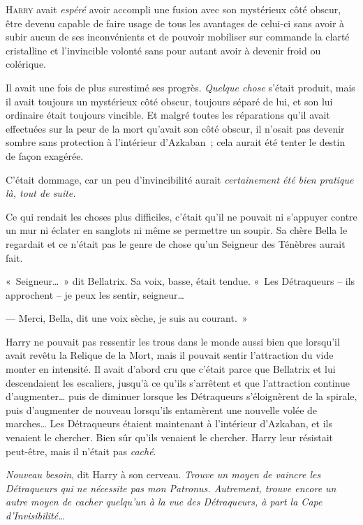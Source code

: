
\lettrine{H}{arry} avait \emph{espéré} avoir accompli une fusion avec son mystérieux côté obscur, être devenu capable de faire usage de tous les avantages de celui-ci sans avoir à subir aucun de ses inconvénients et de pouvoir mobiliser sur commande la clarté cristalline et l'invincible volonté sans pour autant avoir à devenir froid ou colérique.

Il avait une fois de plus surestimé ses progrès.
\emph{Quelque chose} s'était produit, mais il avait toujours un mystérieux côté obscur, toujours séparé de lui, et son lui ordinaire était toujours vincible.
Et malgré toutes les réparations qu'il avait effectuées sur la peur de la mort qu'avait son côté obscur, il n'osait pas devenir sombre sans protection à l'intérieur d'Azkaban~; cela aurait été tenter le destin de façon exagérée.

C'était dommage, car un peu d'invincibilité aurait \emph{certainement été bien pratique là, tout de suite.}

Ce qui rendait les choses plus difficiles, c'était qu'il ne pouvait ni s'appuyer contre un mur ni éclater en sanglots ni même se permettre un soupir.
Sa chère Bella le regardait et ce n'était pas le genre de chose qu'un Seigneur des Ténèbres aurait fait.

«~Seigneur…~»
 dit Bellatrix.
Sa voix, basse, était tendue.
«~Les Détraqueurs -- ils approchent -- je peux les sentir, seigneur…

--- Merci, Bella, dit une voix sèche, je suis au courant.~»

Harry ne pouvait pas ressentir les trous dans le monde aussi bien que lorsqu'il avait revêtu la Relique de la Mort, mais il pouvait sentir l'attraction du vide monter en intensité.
Il avait d'abord cru que c'était parce que Bellatrix et lui descendaient les escaliers, jusqu'à ce qu'ils s'arrêtent et que l'attraction continue d'augmenter… puis de diminuer lorsque les Détraqueurs s'éloignèrent de la spirale, puis d'augmenter de nouveau lorsqu'ils entamèrent une nouvelle volée de marches…
Les Détraqueurs étaient maintenant à l'intérieur d'Azkaban, et ils venaient le chercher.
Bien sûr qu'ils venaient le chercher.
Harry leur résistait peut-être, mais il n'était pas \emph{caché}.

\emph{Nouveau besoin}, dit Harry à son cerveau.
\emph{Trouve un moyen de vaincre les Détraqueurs qui ne nécessite pas mon Patronus.
Autrement, trouve encore un autre moyen de cacher quelqu'un à la vue des Détraqueurs, à part la Cape d'Invisibilité…}

